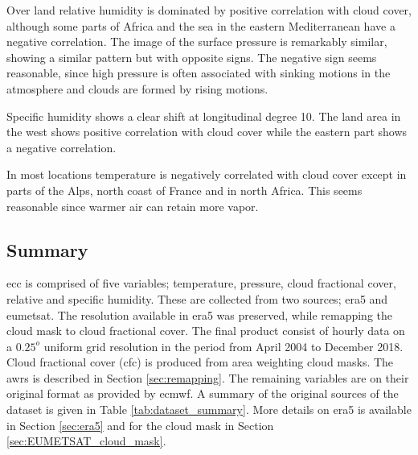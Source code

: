 Over land relative humidity is dominated by positive correlation with cloud cover, although some parts of Africa and the sea in the eastern Mediterranean have a negative correlation. The image of the surface pressure is remarkably similar, showing a similar pattern but with opposite signs. The negative sign seems reasonable, since high pressure is often associated with sinking motions in the atmosphere and clouds are formed by rising motions. 

Specific humidity shows a clear shift at longitudinal degree 10. The land area in the west shows positive correlation with cloud cover while the eastern part shows a negative correlation. 

In most locations temperature is negatively correlated with cloud cover except in parts of the Alps, north coast of France and in north Africa. This seems reasonable since warmer air can retain more vapor.%


\subsection{Summary}
\acrshort{ecc} is comprised of five variables; temperature, pressure, cloud fractional cover, relative and specific humidity. These are collected from two sources; \acrshort{era5} and \acrshort{eumetsat}. The resolution available in \acrshort{era5} was preserved, while remapping the cloud mask to cloud fractional cover. 
The final product consist of %
hourly data on a $0.25^o$ uniform grid resolution in the period from April 2004 to December 2018. Cloud fractional cover (\acrshort{cfc}) is produced from area weighting cloud masks. The \acrshort{awrs} is described in Section \ref{sec:remapping}. The remaining variables are on their original format as provided by \acrfull{ecmwf}. A summary of the original sources of the dataset is given in Table \ref{tab:dataset_summary}. More details on \acrshort{era5} is available in Section \ref{sec:era5} and for the cloud mask in Section \ref{sec:EUMETSAT_cloud_mask}. 
\clearpage
